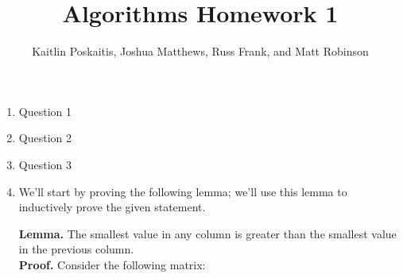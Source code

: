 \documentclass[12pt]{article}
\title{\bf Algorithms Homework 1}
\author{Kaitlin Poskaitis, Joshua Matthews, Russ Frank, and Matt Robinson}
\date{}
\begin{document}
\maketitle

\begin{enumerate}

\item Question 1

\item Question 2

\item Question 3

\item We'll start by proving the following lemma; we'll use this lemma to
inductively prove the given statement.

\textbf{Lemma.} The smallest value in any column is greater than the smallest
value in the previous column.\\
\textbf{Proof.} Consider the following matrix:


\end{enumerate}
\end{document}
